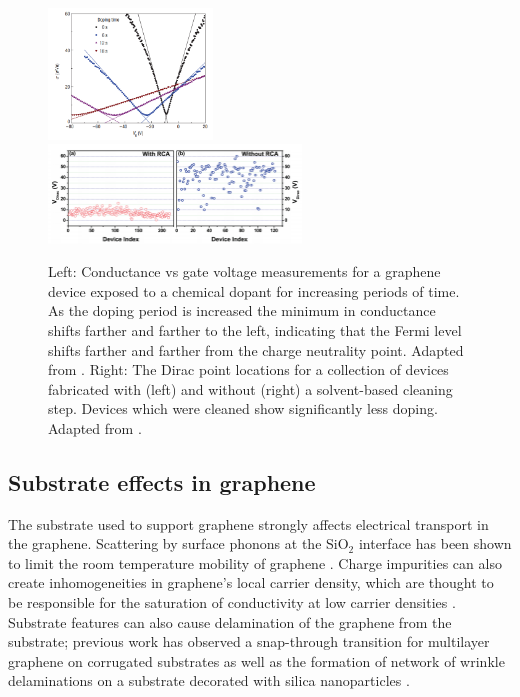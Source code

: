 \documentclass[edeposit,fullpage,draftthesis]{uiucthesis2009}
\begin{document}
            \begin{figure}
            \centering
            \includegraphics[width=0.39\textwidth]{images/background/gate_sweep_doping.png}
            \includegraphics[width=0.6\textwidth]{images/background/rca_clean.png}
            \caption[Conductance vs gate voltage after chemical doping]{
            Left: Conductance vs gate voltage measurements for a graphene device exposed to a 
            chemical dopant for increasing periods of time. As the doping period is increased
            the minimum in conductance shifts farther and farther to the left, indicating that
            the Fermi level shifts farther and farther from the charge neutrality point.
            Adapted from \cite{chen2008charged}.
            Right: The Dirac point locations for a collection of devices fabricated with (left)
            and without (right) a solvent-based cleaning step. Devices which were cleaned show 
            significantly less doping.
            Adapted from \cite{liang2011toward}.
            }
            \label{fig:chemical_doping}
            \end{figure}
    
        \subsection{Substrate effects in graphene}
        
        The substrate used to support graphene strongly affects electrical transport in the graphene. 
        Scattering by surface phonons at the SiO$_2$ interface has been shown to limit the room 
        temperature mobility of graphene \cite{Chen2008}.
        Charge impurities can also create inhomogeneities in graphene's local carrier density, 
        which are thought to be responsible for the saturation of conductivity at low carrier 
        densities \cite{Hwang2007}. Substrate features can also cause delamination of the graphene 
        from the substrate; previous work has observed a snap-through transition for multilayer 
        graphene on corrugated substrates \cite{Scharfenberg2012} as well as the formation of 
        network of wrinkle delaminations on a substrate decorated with silica nanoparticles \cite{Yamamoto2012}.
    
\end{document}
